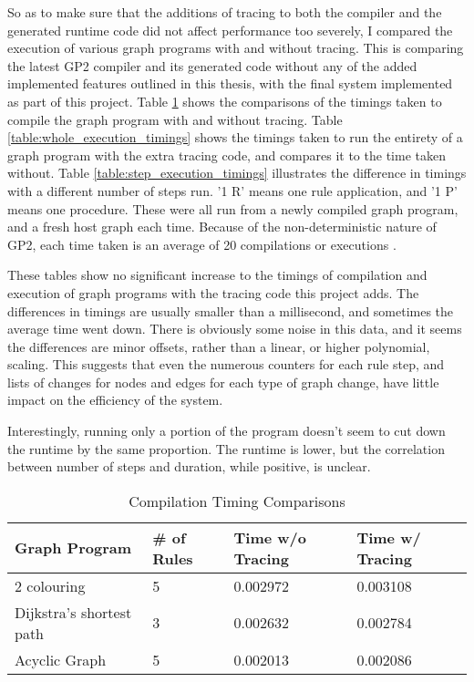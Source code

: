 \documentclass{UoYCSproject}
\begin{document}
So as to make sure that the additions of tracing to both the compiler and the generated runtime code did not affect performance too severely, I compared the execution of various graph programs with and without tracing. This is comparing the latest GP2 compiler and its generated code without any of the added implemented features outlined in this thesis, with the final system implemented as part of this project. Table \ref{table:compilation_timings} shows the comparisons of the timings taken to compile the graph program with and without tracing. Table \ref{table:whole_execution_timings} shows the timings taken to run the entirety of a graph program with the extra tracing code, and compares it to the time taken without. Table \ref{table:step_execution_timings} illustrates the difference in timings with a different number of steps run. '1 R' means one rule application, and '1 P' means one procedure. These were all run from a newly compiled graph program, and a fresh host graph each time. Because of the non-deterministic nature of GP2, each time taken is an average of 20 compilations or executions \cite{measuring_performance}.

These tables show no significant increase to the timings of compilation and execution of graph programs with the tracing code this project adds. The differences in timings are usually smaller than a millisecond, and sometimes the average time went down. There is obviously some noise in this data, and it seems the differences are minor offsets, rather than a linear, or higher polynomial, scaling. This suggests that even the numerous counters for each rule step, and lists of changes for nodes and edges for each type of graph change, have little impact on the efficiency of the system.

Interestingly, running only a portion of the program doesn't seem to cut down the runtime by the same proportion. The runtime is lower, but the correlation between number of steps and duration, while positive, is unclear.

\begin{table}
\centering
\begin{tabular}{p{4cm} | l | l | l}
	Graph Program & \# of Rules & Time w/o Tracing & Time w/ Tracing \\ 
	\hline
	2 colouring              & 5 & 0.002972 & 0.003108 \\
	Dijkstra's shortest path & 3 & 0.002632 & 0.002784 \\
	Acyclic Graph            & 5 & 0.002013 & 0.002086 \\
\end{tabular}
\caption{Compilation Timing Comparisons}
\label{table:compilation_timings}
\end{table}
\end{document}
